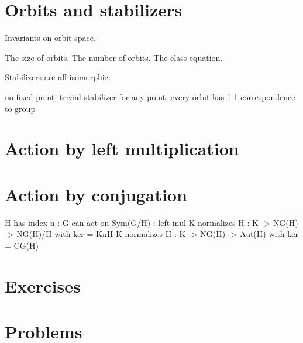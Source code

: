\documentclass{../../large}
\begin{document}
\section{Orbits and stabilizers}
Invariants on orbit space.

\begin{prb}
The size of orbits.
The number of orbits.
The class equation.
\end{prb}


\begin{prb}
\begin{parts}
\item Stabilizers are all isomorphic.
\end{parts}
\end{prb}

\begin{prb}
no fixed point,
trivial stabilizer for any point,
every orbit has 1-1 correspondence to group
\end{prb}

\section{Action by left multiplication}

\section{Action by conjugation}
\begin{prb}
\end{prb}

\begin{prb}
\end{prb}

\begin{prb}
\end{prb}

H has index n  : G can act on Sym(G/H) : left mul
K normalizes H : K -> NG(H) -> NG(H)/H  with ker = KnH
K normalizes H : K -> NG(H) -> Aut(H)  with ker = CG(H)







\section*{Exercises}

\section*{Problems}
\end{document}
